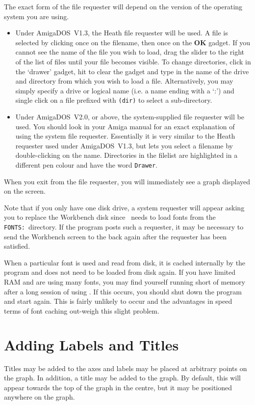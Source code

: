 The exact form of the file requester will depend on the version of the operating 
system you are using. 
\begin{itemize}
\item Under AmigaDOS~V1.3, the Heath file requester will be used. A 
file is selected by clicking once on the filename, then once on the {\bf OK} gadget.
If you cannot see the name of the file you wish to load, drag the slider to the 
right of the list of files until your file becomes visible. To change directories, 
click in the `drawer' gadget, hit  to clear the gadget and type in the name of 
the drive and directory from which you wish to load a file. Alternatively, you 
may simply specify a drive or logical name (i.e. a name ending with a `:') and 
single click on a file prefixed with {\tt (dir)} to select a sub-directory.
\item Under AmigaDOS~V2.0, or above, the system-supplied file requester will be used.
You should look in your Amiga manual for an exact explanation of using the system 
file requester. Essentially it is very similar to the Heath requester used under 
AmigaDOS~V1.3, but lets you select a filename by double-clicking on the name. 
Directories in the filelist are highlighted in a different pen colour and have the 
word {\tt Drawer}.
\end{itemize}

When you exit from the file requester, you will immediately see a graph displayed
on the screen.

Note that if you only have one disk drive, a system requester will appear asking
you to replace the Workbench disk since \amplot\ needs to load fonts from the 
{\tt FONTS:}\ directory. If the program posts such a requester, it may be necessary 
to send the Workbench screen to the back again after the requester has been 
satisfied.

When  a particular font is used and read from disk, it is 
cached internally by the program and does not need to be loaded from disk again. 
If you have limited RAM and are using many fonts, you may find yourself running 
short of memory after a long session of using \amplot. If this occurs, you should 
shut down the program and start again. This is fairly unlikely to occur and the
advantages in speed terms of font caching out-weigh this slight problem.







\section{Adding Labels and Titles}
Titles may be added to the axes and labels may be placed 
at arbitrary points on the graph. In addition, a title
may be added to the graph. By default, this will appear towards 
the top of the graph in the centre, but it may be positioned anywhere on the 
graph.

